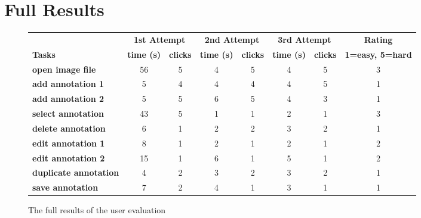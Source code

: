 \section{Full Results}
\begin{figure}[ht]
	\begin{center}
		\begin{tabular}{ | l | c | c | c | c | c | c | c | }
			\hline
			& \multicolumn{2}{|c|}{\bf 1st Attempt} & \multicolumn{2}{|c|}{\bf 2nd Attempt} & \multicolumn{2}{|c|}{\bf 3rd Attempt} & \bf Rating \\
			\bf Tasks & \bf time (s) & \bf clicks & \bf time (s) & \bf clicks & \bf time (s) & \bf clicks & \bf 1=easy, 5=hard \\
			\hline \hline
			\bf open image file & 56 & 5 & 4 & 5 & 4 & 5 & 3 \\
			\bf add annotation 1 & 5 & 4 & 4 & 4 & 4 & 5 & 1 \\
			\bf add annotation 2 & 5 & 5 & 6 & 5 & 4 & 3 & 1 \\
			\bf select annotation & 43 & 5 & 1 & 1 & 2 & 1 & 3 \\
			\bf delete annotation & 6 & 1 & 2 & 2 & 3 & 2 & 1 \\
			\bf edit annotation 1 & 8 & 1 & 2 & 1 & 2 & 1 & 2 \\
			\bf edit annotation 2 & 15 & 1 & 6 & 1 & 5 & 1 & 2 \\
			\bf duplicate annotation & 4 & 2 & 3 & 2 & 3 & 2 & 1 \\
			\bf save annotation & 7 & 2 & 4 & 1 & 3 & 1 & 1 \\
			\hline
		\end{tabular}
		\caption{The full results of the user evaluation}
	\end{center}
\end{figure}
